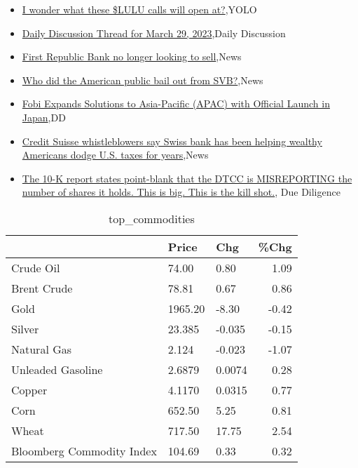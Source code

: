 \documentclass{article}%
\begin{document}
%
\begin{itemize}%
\item%
\href{https://reddit.com/r/wallstreetbets/comments/125kdrt/i\_wonder\_what\_these\_lulu\_calls\_will\_open\_at/}{I wonder what these \$LULU calls will open at?},YOLO%
\item%
\href{https://reddit.com/r/wallstreetbets/comments/125j1h4/daily\_discussion\_thread\_for\_march\_29\_2023/}{Daily Discussion Thread for March 29, 2023},Daily Discussion%
\item%
\href{https://reddit.com/r/wallstreetbets/comments/125hdav/first\_republic\_bank\_no\_longer\_looking\_to\_sell/}{First Republic Bank no longer looking to sell},News%
\item%
\href{https://reddit.com/r/wallstreetbets/comments/125h6zy/who\_did\_the\_american\_public\_bail\_out\_from\_svb/}{Who did the American public bail out from SVB?},News%
\item%
\href{https://reddit.com/r/Baystreetbets/comments/125mfij/fobi\_expands\_solutions\_to\_asiapacific\_apac\_with/}{Fobi Expands Solutions to Asia-Pacific (APAC) with Official Launch in Japan},DD%
\item%
\href{https://reddit.com/r/Economics/comments/125k8ea/credit\_suisse\_whistleblowers\_say\_swiss\_bank\_has/}{Credit Suisse whistleblowers say Swiss bank has been helping wealthy Americans dodge U.S. taxes for years},News%
\item%
\href{https://reddit.com/r/Superstonk/comments/125m4kl/the\_10k\_report\_states\_pointblank\_that\_the\_dtcc\_is/}{The 10-K report states point-blank that the DTCC is MISREPORTING the number of shares it holds. This is big. This is the kill shot.}, Due Diligence%
\end{itemize}%


\begin{table}[htbp]%
\caption{top\_commodities}%
\centering%
\begin{adjustbox}{width=1\textwidth}%
\begin{tabular}{lllr}
\toprule
                          &   Price &    Chg &  \%Chg \\
\midrule
               Crude Oil  &   74.00 &   0.80 &  1.09 \\
             Brent Crude  &   78.81 &   0.67 &  0.86 \\
                    Gold  & 1965.20 &  -8.30 & -0.42 \\
                  Silver  &  23.385 & -0.035 & -0.15 \\
             Natural Gas  &   2.124 & -0.023 & -1.07 \\
       Unleaded Gasoline  &  2.6879 & 0.0074 &  0.28 \\
                  Copper  &  4.1170 & 0.0315 &  0.77 \\
                    Corn  &  652.50 &   5.25 &  0.81 \\
                   Wheat  &  717.50 &  17.75 &  2.54 \\
Bloomberg Commodity Index &  104.69 &   0.33 &  0.32 \\
\bottomrule
\end{tabular}
%
\end{adjustbox}%
\end{table}
\end{document}
